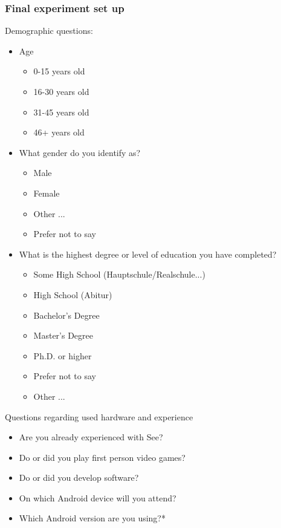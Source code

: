 \subsubsection{Final experiment set up}
\label{final}
Demographic questions:
\begin{itemize}
  \item Age
        \begin{itemize}
          \item 0-15 years old
          \item 16-30 years old
          \item 31-45 years old
          \item 46+ years old
        \end{itemize}
  \item What gender do you identify as?
        \begin{itemize}
          \item Male
          \item Female
          \item Other ...
          \item Prefer not to say
        \end{itemize}
  \item What is the highest degree or level of education you have completed?
        \begin{itemize}
          \item Some High School (Hauptschule/Realschule...)
          \item High School (Abitur)
          \item Bachelor's Degree
          \item Master's Degree
          \item Ph.D. or higher
          \item Prefer not to say
          \item Other ...
        \end{itemize}
\end{itemize}

Questions regarding used hardware and experience
\begin{itemize}
  \item Are you already experienced with See?
  \item Do or did you play first person video games?
  \item Do or did you develop software?
  \item On which Android device will you attend?
  \item Which Android version are you using?*
\end{itemize}

